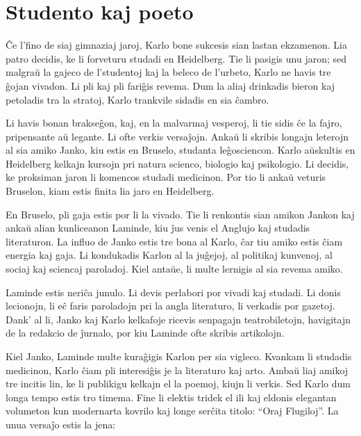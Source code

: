 \chapter{Studento kaj poeto}

Ĉe l'fino de siaj gimnaziaj jaroj, Karlo bone sukcesis sian lastan ekzamenon. Lia patro decidis, ke li forveturu studadi en Heidelberg. Tie li pasigis unu jaron; sed malgraŭ la gajeco de l'studentoj kaj la beleco de l'urbeto, Karlo ne havis tre ĝojan vivadon. Li pli kaj pli fariĝis revema. Dum la aliaj drinkadis bieron kaj petoladis tra la stratoj, Karlo trankvile sidadis en sia ĉambro.

Li havis bonan brakseĝon, kaj, en la malvarmaj vesperoj, li tie sidis ĉe la fajro, pripensante aŭ legante. Li ofte verkis versaĵojn. Ankaŭ li skribis longajn leterojn al sia amiko Janko, kiu estis en Bruselo, studanta leĝosciencon. Karlo aŭskultis en Heidelberg kelkajn kursojn pri natura scienco, biologio kaj psikologio. Li decidis, ke proksiman jaron li komencos studadi medicinon. Por tio li ankaŭ veturis Bruselon, kiam estis finita lia jaro en Heidelberg.

En Bruselo, pli gaja estis por li la vivado. Tie li renkontis sian amikon Jankon kaj ankaŭ alian kunliceanon Laminde, kiu ĵus venis el Anglujo kaj studadis literaturon. La influo de Janko estis tre bona al Karlo, ĉar tiu amiko estis ĉiam energia kaj gaja. Li kondukadis Karlon al la juĝejoj, al politikaj kunvenoj, al sociaj kaj sciencaj paroladoj. Kiel antaŭe, li multe lernigis al sia revema amiko.

Laminde estis neriĉa junulo. Li devis perlabori por vivadi kaj studadi. Li donis lecionojn, li eĉ faris paroladojn pri la angla literaturo, li verkadis por gazetoj. Dank' al li, Janko kaj Karlo kelkafoje ricevis senpagajn teatrobiletojn, havigitajn de la redakcio de ĵurnalo, por kiu Laminde ofte skribis artikolojn.

Kiel Janko, Laminde multe kuraĝigis Karlon per sia vigleco. Kvankam li studadis medicinon, Karlo ĉiam pli interesiĝis je la literaturo kaj arto. Ambaŭ liaj amikoj tre incitis lin, ke li publikigu kelkajn el la poemoj, kiujn li verkis. Sed Karlo dum longa tempo estis tro timema. Fine li elektis tridek el ili kaj eldonis elegantan volumeton kun modernarta kovrilo kaj longe serĉita titolo: ``Oraj Flugiloj''. La unua versaĵo estis la jena:

\newpage

